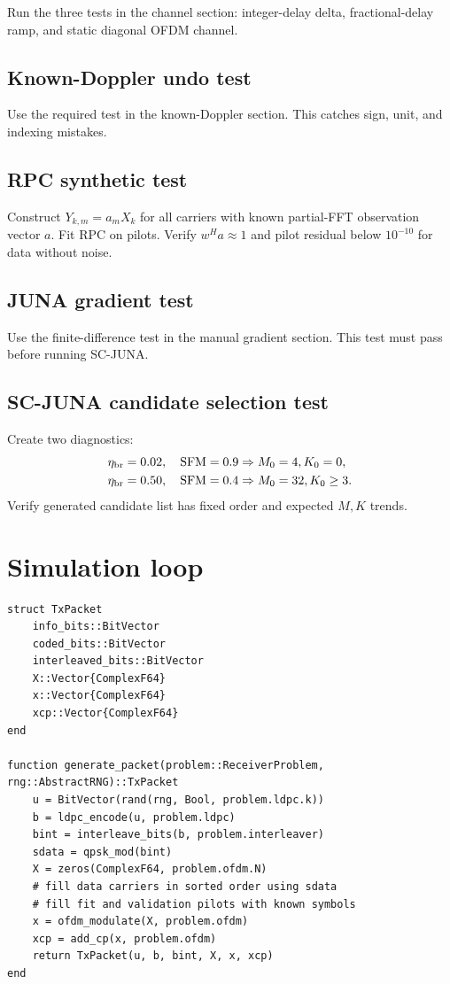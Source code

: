 \documentclass[11pt]{article}
\begin{document}
Run the three tests in the channel section: integer-delay delta, fractional-delay ramp, and static diagonal OFDM channel.

\subsection{Known-Doppler undo test}

Use the required test in the known-Doppler section. This catches sign, unit, and indexing mistakes.

\subsection{RPC synthetic test}

Construct $Y_{k,m}=a_m X_k$ for all carriers with known partial-FFT observation vector $a$. Fit RPC on pilots. Verify $w^Ha\approx1$ and pilot residual below $10^{-10}$ for data without noise.

\subsection{JUNA gradient test}

Use the finite-difference test in the manual gradient section. This test must pass before running SC-JUNA.

\subsection{SC-JUNA candidate selection test}

Create two diagnostics:
\begin{align}
\eta_{\rm br}=0.02,\quad {\rm SFM}=0.9 &\Rightarrow M_0=4, K_0=0,\\
\eta_{\rm br}=0.50,\quad {\rm SFM}=0.4 &\Rightarrow M_0=32, K_0\ge3.
\end{align}
Verify generated candidate list has fixed order and expected $M,K$ trends.

\clearpage
\section{Simulation loop}

\begin{lstlisting}
struct TxPacket
    info_bits::BitVector
    coded_bits::BitVector
    interleaved_bits::BitVector
    X::Vector{ComplexF64}
    x::Vector{ComplexF64}
    xcp::Vector{ComplexF64}
end

function generate_packet(problem::ReceiverProblem, rng::AbstractRNG)::TxPacket
    u = BitVector(rand(rng, Bool, problem.ldpc.k))
    b = ldpc_encode(u, problem.ldpc)
    bint = interleave_bits(b, problem.interleaver)
    sdata = qpsk_mod(bint)
    X = zeros(ComplexF64, problem.ofdm.N)
    # fill data carriers in sorted order using sdata
    # fill fit and validation pilots with known symbols
    x = ofdm_modulate(X, problem.ofdm)
    xcp = add_cp(x, problem.ofdm)
    return TxPacket(u, b, bint, X, x, xcp)
end
\end{lstlisting}
\end{document}
